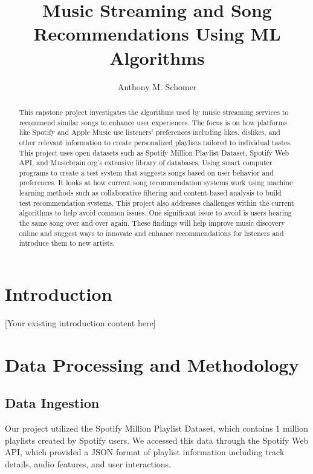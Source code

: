 \documentclass[runningheads]{llncs}
\begin{document}
%
\title{Music Streaming and Song Recommendations Using ML Algorithms}
%
\author{Anthony M. Schomer}
%
%
%
\maketitle              %
%
\begin{abstract}
This capstone project investigates the algorithms used by music streaming services to recommend similar songs to enhance user experiences. The focus is on how platforms like Spotify and Apple Music use listeners' preferences including likes, dislikes, and other relevant information to create personalized playlists tailored to individual tastes. This project uses open datasets such as Spotify Million Playlist Dataset, Spotify Web API, and Musicbrain.org's extensive library of databases. Using smart computer programs to create a test system that suggests songs based on user behavior and preferences. It looks at how current song recommendation systems work using machine learning methods such as collaborative filtering and content-based analysis to build test recommendation systems. This project also addresses challenges within the current algorithms to help avoid common issues. One significant issue to avoid is users hearing the same song over and over again. These findings will help improve music discovery online and suggest ways to innovate and enhance recommendations for listeners and introduce them to new artists.

\end{abstract}

\section{Introduction}
[Your existing introduction content here]

\section{Data Processing and Methodology}

\subsection{Data Ingestion}
Our project utilized the Spotify Million Playlist Dataset, which contains 1 million playlists created by Spotify users. We accessed this data through the Spotify Web API, which provided a JSON format of playlist information including track details, audio features, and user interactions.
\end{document}
